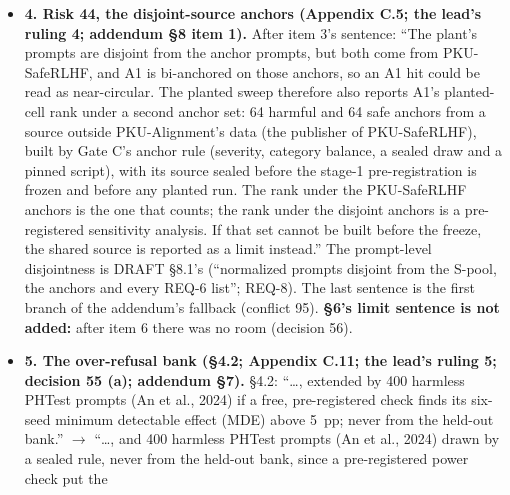 \documentclass{article}
\theoremstyle{plain}
\theoremstyle{definition}
\theoremstyle{remark}
\begin{document}
\begin{itemize}
        sentences: ``The Self-Inf-N-style score's planted-cell rank joins the
        ranks scored without new runs; if its scorer is not committed before
        Gate B's category runs, it leaves both that list and the counting rule,
        and only A1 counts.'' The ruling's ``by W1'' is written ``before Gate
        B's category runs'' (the DRAFT's deadline line: W1 is before Gate B wave
        1; conflict 92). One marker [PLANNED; the stage-1 pre-registration is
        not yet frozen] closes items 3 and 4. \S{}4.5 is unchanged: it still
        names both counted diagnostics, without the condition.
  \item \textbf{4. Risk 44, the disjoint-source anchors (Appendix C.5; the
        lead's ruling 4; addendum \S{}8 item 1).} After item 3's sentence: ``The
        plant's prompts are disjoint from the anchor prompts, but both come from
        PKU-SafeRLHF, and A1 is bi-anchored on those anchors, so an A1 hit could
        be read as near-circular. The planted sweep therefore also reports A1's
        planted-cell rank under a second anchor set: 64 harmful and 64 safe
        anchors from a source outside PKU-Alignment's data (the publisher of
        PKU-SafeRLHF), built by Gate C's anchor rule (severity, category
        balance, a sealed draw and a pinned script), with its source sealed
        before the stage-1 pre-registration is frozen and before any planted
        run. The rank under the PKU-SafeRLHF anchors is the one that counts; the
        rank under the disjoint anchors is a pre-registered sensitivity
        analysis. If that set cannot be built before the freeze, the shared
        source is reported as a limit instead.'' The prompt-level disjointness
        is DRAFT \S{}8.1's (``normalized prompts disjoint from the S-pool, the
        anchors and every REQ-6 list''; REQ-8). The last sentence is the first
        branch of the addendum's fallback (conflict 95). \textbf{\S{}6's limit
        sentence is not added:} after item 6 there was no room (decision 56).
  \item \textbf{5. The over-refusal bank (\S{}4.2; Appendix C.11; the lead's
        ruling 5; decision 55 (a); addendum \S{}7).} \S{}4.2: ``\ldots{},
        extended by 400 harmless PHTest prompts (An et al., 2024) if a free,
        pre-registered check finds its six-seed minimum detectable effect (MDE)
        above 5~pp; never from the held-out bank.'' $\to$ ``\ldots{}, and 400
        harmless PHTest prompts (An et al., 2024) drawn by a sealed rule, never
        from the held-out bank, since a pre-registered power check put the

\end{itemize}
\end{document}
